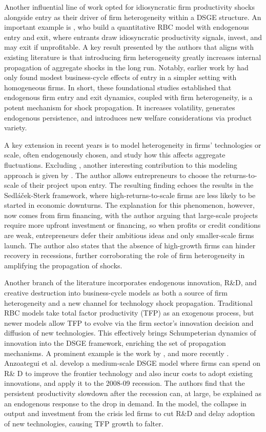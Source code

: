 \documentclass[a4paper,12pt]{article} %
\numberwithin{equation}{section} %
\numberwithin{figure}{section}
\numberwithin{table}{section}
\begin{document}
 Another influential line of work opted for idiosyncratic firm productivity shocks alongside entry as their driver of firm heterogeneity within a DSGE structure. An important example is \textcite{clementi2016entry}, who build a quantitative RBC model with endogenous entry and exit, where entrants draw idiosyncratic productivity signals, invest, and may exit if unprofitable. A key result presented by the authors that aligns with existing literature is that introducing firm heterogeneity greatly increases internal propagation of aggregate shocks in the long run. Notably, earlier work by \textcite{samaniego2008entry} had only found modest business-cycle effects of entry in a simpler setting with homogeneous firms. In short, these foundational studies established that endogenous firm entry and exit dynamics, coupled with firm heterogeneity, is a potent mechanism for shock propagation. It increases volatility, generates endogenous persistence, and introduces new welfare considerations via product variety.

 A key extension in recent years is to model heterogeneity in firms' technologies or scale, often endogenously chosen, and study how this affects aggregate fluctuations. Excluding \textcite{sedlavcek2017growth}, another interesting contribution to this modeling approach is given by \textcite{smirnyagin2023returns}. The author allows entrepreneurs to choose the returns-to-scale of their project upon entry. The resulting finding echoes the results in the Sedláček-Sterk framework, where high-returns-to-scale firms are less likely to be started in economic downturns. The explanation for this phenomenon, however, now comes from firm financing, with the author arguing that large-scale projects require more upfront investment or financing, so when profits or credit conditions are weak, entrepreneurs defer their ambitious ideas and only smaller-scale firms launch. The author also states that the absence of high-growth firms can hinder recovery in recessions, further corroborating the role of firm heterogeneity in amplifying the propagation of shocks.

 Another branch of the literature incorporates endogenous innovation, R\&D, and creative destruction into business-cycle models as both a source of firm heterogeneity and a new channel for technology shock propagation. Traditional RBC models take total factor productivity (TFP) as an exogenous process, but newer models allow TFP to evolve via the firm sector's innovation decision and diffusion of new technologies. This effectively brings Schumpeterian dynamics of innovation into the DSGE framework, enriching the set of propagation mechanisms.  A prominent example is the work by \textcite{comin2006medium}, and more recently \textcite{anzoategui2019endogenous}. Anzoategui et al. develop a medium-scale DSGE model where firms can spend on R\& D to improve the frontier technology and also incur costs to adopt existing innovations, and apply it to the 2008-09 recession. The authors find that the persistent productivity slowdown after the recession can, at large, be explained as an endogenous response to the drop in demand. In the model, the collapse in output and investment from the crisis led firms to cut R\&D and delay adoption of new technologies, causing TFP growth to falter.
\end{document}
